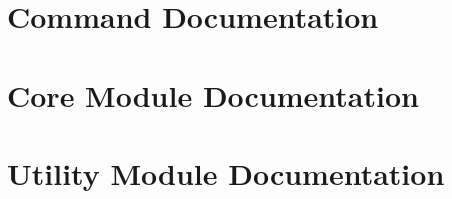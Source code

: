 \documentclass{report}
\begin{document}
\printindex\label{idx}
\appendix
\chapter[Commands]{Command Documentation}\label{commands}



\chapter[Modules]{Core Module Documentation}\label{coremodules}
























\chapter[Utility Modules]{Utility Module Documentation}\label{utilitymodules}

\end{document}

